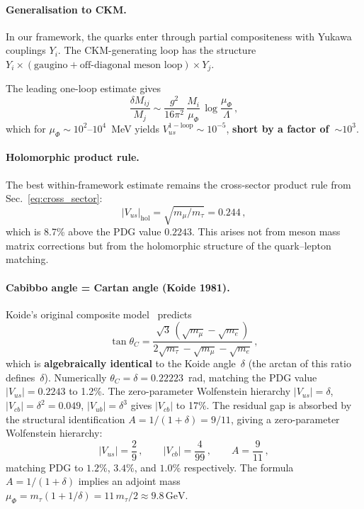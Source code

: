 \documentclass[12pt,a4paper]{article}
\newcommand{\GeV}{\,\mathrm{GeV}}
\begin{document}
\paragraph{Generalisation to CKM.}
In our framework, the quarks enter through partial compositeness
with Yukawa couplings $Y_i$.
The CKM-generating loop has the structure
$Y_i \times (\text{gaugino} + \text{off-diagonal meson loop})
\times Y_j$.

The leading one-loop estimate gives
\begin{equation}
  \frac{\delta M_{ij}}{M_j} \sim
  \frac{g^2}{16\pi^2}\,\frac{M_i}{\mu_\Phi}\,
  \log\frac{\mu_\Phi}{\Lambda}\,,
\end{equation}
which for $\mu_\Phi \sim 10^2$--$10^4$~MeV yields
$V_{us}^{\mathrm{1-loop}} \sim 10^{-5}$,
\textbf{short by a factor of~$\sim 10^3$}.

\paragraph{Holomorphic product rule.}
The best within-framework estimate remains the cross-sector
product rule from Sec.~\ref{eq:cross_sector}:
\begin{equation}
  |V_{us}|_{\mathrm{hol}} = \sqrt{m_\mu/m_\tau} = 0.244\,,
\end{equation}
which is 8.7\% above the PDG value $0.2243$.
This arises not from meson mass matrix corrections but from
the holomorphic structure of the quark--lepton matching.

\paragraph{Cabibbo angle = Cartan angle (Koide 1981).}
Koide's original composite model~\cite{Koide:1983qe} predicts
\begin{equation}
  \tan\theta_C = \frac{\sqrt{3}\,(\sqrt{m_\mu} - \sqrt{m_e})}
  {2\sqrt{m_\tau} - \sqrt{m_\mu} - \sqrt{m_e}}\,,
  \label{eq:koide_cabibbo}
\end{equation}
which is \textbf{algebraically identical} to the Koide angle~$\delta$
(the arctan of this ratio defines~$\delta$).
Numerically $\theta_C = \delta = 0.22223$~rad, matching the PDG value
$|V_{us}| = 0.2243$ to 1.2\%.
The zero-parameter Wolfenstein hierarchy
$|V_{us}| = \delta$, $|V_{cb}| = \delta^2 = 0.049$, $|V_{ub}| = \delta^3$
gives $|V_{cb}|$ to 17\%.
The residual gap is absorbed by the structural identification
$A = 1/(1+\delta) = 9/11$, giving a zero-parameter Wolfenstein hierarchy:
\begin{equation}
  |V_{us}| = \frac{2}{9}\,,\qquad
  |V_{cb}| = \frac{4}{99}\,,\qquad
  A = \frac{9}{11}\,,
  \label{eq:wolfenstein_zero}
\end{equation}
matching PDG to $1.2\%$, $3.4\%$, and $1.0\%$ respectively.
The formula $A = 1/(1+\delta)$ implies an adjoint mass
$\mu_\Phi = m_\tau(1 + 1/\delta) = 11\,m_\tau/2 \approx 9.8\GeV$.
\end{document}
